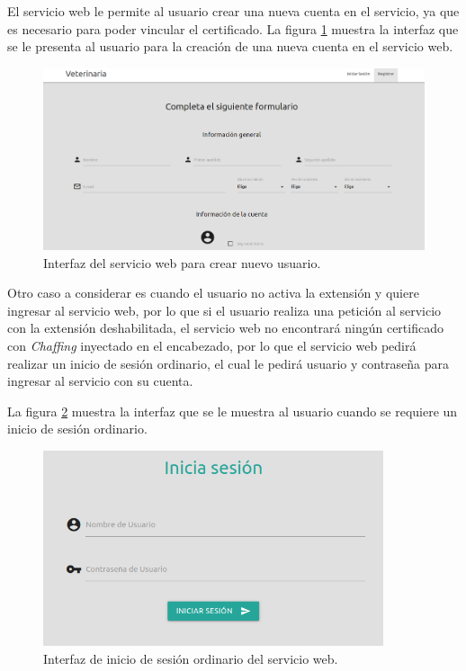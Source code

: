 \documentclass[12pt, a4paper, titlepage]{report}
\begin{document}
        	   El servicio web le permite al usuario crear una nueva cuenta en el servicio, ya que es necesario para poder vincular el certificado. La figura \ref{fig:UI_nuevoUsuarioServicioWeb} muestra la interfaz que se le presenta al usuario para la creación de una nueva cuenta en el servicio web.
        	   
        	   \begin{figure}[H]
    				\begin{center}	\includegraphics[width=12cm]{./imagenes/Disenio/Componente_1/UI_nuevoUsuarioServicioWeb.PNG}
    					\caption[Interfaz]{Interfaz del servicio web para crear nuevo usuario.}
    				\label{fig:UI_nuevoUsuarioServicioWeb}
    				\end{center}
    			\end{figure}
    			
    	        Otro caso a considerar es cuando el usuario no activa la extensión y quiere ingresar al servicio web, por lo que si el usuario realiza una petición al servicio con la extensión deshabilitada, el servicio web no encontrará ningún certificado con \textit{Chaffing} inyectado en el encabezado, por lo que el servicio web pedirá realizar un inicio de sesión ordinario, el cual le pedirá usuario y contraseña para ingresar al servicio con su cuenta. 
	        
    	        La figura \ref{fig:UI_inicioSesionComun} muestra la interfaz que se le muestra al usuario cuando se requiere un inicio de sesión ordinario.
    	        
    	        \begin{figure}[H]
    				\begin{center}	\includegraphics[width=10cm]{./imagenes/Disenio/Componente_1/UI_inicioSesionComun.PNG}
    					\caption[Interfaz]{Interfaz de inicio de sesión ordinario del servicio web.}
    				\label{fig:UI_inicioSesionComun}
    				\end{center}
    			\end{figure}
			
\end{document}

